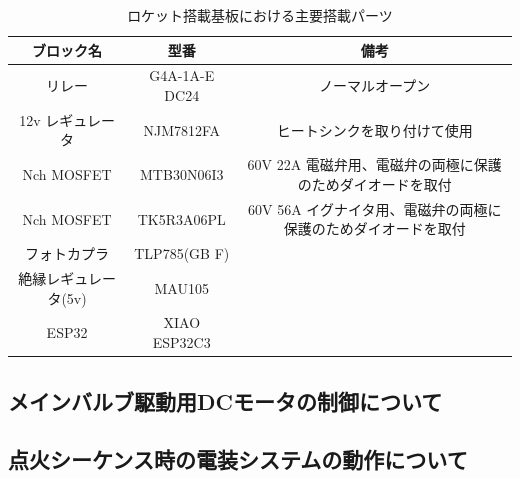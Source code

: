 \documentclass[dvipdfmx,a4j]{jsarticle}
\begin{document}
\begin{table}[htbp]
    \begin{tabular}{c|c|c}
        \hline
        ブロック名           & 型番          & 備考                                                           \\ \hline \hline
        リレー               & G4A-1A-E DC24 & ノーマルオープン                                               \\ \hline
        12v レギュレータ     & NJM7812FA     & ヒートシンクを取り付けて使用                                   \\ \hline
        Nch MOSFET           & MTB30N06I3    & 60V 22A 電磁弁用、電磁弁の両極に保護のためダイオードを取付     \\ \hline
        Nch MOSFET           & TK5R3A06PL    & 60V 56A イグナイタ用、電磁弁の両極に保護のためダイオードを取付 \\ \hline
        フォトカプラ         & TLP785(GB F)  &                                                                \\ \hline
        絶縁レギュレータ(5v) & MAU105        &                                                                \\ \hline
        ESP32                & XIAO ESP32C3  &                                                                \\
        \hline
    \end{tabular}
    \caption{ロケット搭載基板における主要搭載パーツ}
    \label{GSEAviPartList}
\end{table}

\subsection{メインバルブ駆動用DCモータの制御について}

\subsection{点火シーケンス時の電装システムの動作について}
\end{document}
